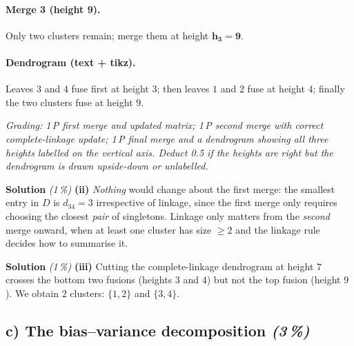 \documentclass[11pt,a4paper]{article}
\newcommand{\subpoints}[1]{\textit{(#1\,\%)}}
\newcommand{\sol}{\noindent\textbf{Solution}}
\begin{document}
\paragraph{Merge 3 (height 9).} Only two clusters remain; merge them at height $\mathbf{h_3=9}$.

\paragraph{Dendrogram (text + tikz).} Leaves $3$ and $4$ fuse first at height $3$; then leaves
$1$ and $2$ fuse at height $4$; finally the two clusters fuse at height $9$.
\begin{center}
\end{center}

\noindent\emph{Grading: 1\,P first merge and updated matrix; 1\,P second merge with correct
complete-linkage update; 1\,P final merge and a dendrogram showing all three heights labelled
on the vertical axis. Deduct 0.5 if the heights are right but the dendrogram is drawn upside-down
or unlabelled.}

\medskip
\sol{} \subpoints{1} \textbf{(ii)} \emph{Nothing} would change about the first merge: the
smallest entry in $D$ is $d_{34}=3$ irrespective of linkage, since the first merge only requires
choosing the closest \emph{pair} of singletons. Linkage only matters from the \emph{second} merge
onward, when at least one cluster has size $\geq 2$ and the linkage rule decides how to summarise it.

\medskip
\sol{} \subpoints{1} \textbf{(iii)} Cutting the complete-linkage dendrogram at height $7$
crosses the bottom two fusions (heights $3$ and $4$) but not the top fusion (height $9$). We obtain
$\boxed{2}$ clusters: $\boxed{\{1,2\}}$ and $\boxed{\{3,4\}}$.

\subsection*{c) The bias--variance decomposition \subpoints{3}}
\end{document}

